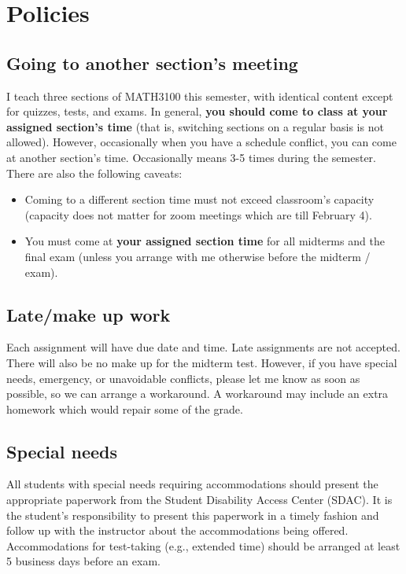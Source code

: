 \documentclass[oneside,11pt]{amsart}
\begin{document}
\section{Policies}

\subsection{Going to another section's meeting}
\label{sub:another_section_going}

I teach three sections of MATH3100 this semester, with identical content
except for quizzes, tests, and exams.
In general, \textbf{you should come to class at your assigned section's time}
(that is, switching sections on a regular basis is not allowed).
However, occasionally when you have a schedule conflict,
you can come at another section's time. Occasionally means 3-5 times 
during the semester. 
There are also the following caveats:
\begin{itemize}
	\item 
		Coming to a different section time must not exceed classroom's capacity
		(capacity does not matter for zoom meetings which are till February 4).
	\item You must come at \textbf{your assigned section time} for 
		all midterms and the final exam
		(unless you arrange with me otherwise 
		before the midterm / exam).
\end{itemize}


\subsection{Late/make up work} Each assignment will have due date and time.
Late assignments are not accepted. There will also be no make up for the midterm test.
However, if you have special needs, emergency, or unavoidable conflicts, please
let me know as soon as possible, so we can arrange a workaround.
A workaround may include an extra homework which would repair some of the grade.

\subsection{Special needs}

All students with special needs requiring accommodations should present the
appropriate paperwork from the Student Disability Access Center (SDAC). It is
the student's responsibility to present this paperwork in a timely fashion and
follow up with the instructor about the accommodations being offered.
Accommodations for test-taking (e.g., extended time) should be arranged at
least 5 business days before an exam.
\end{document}
